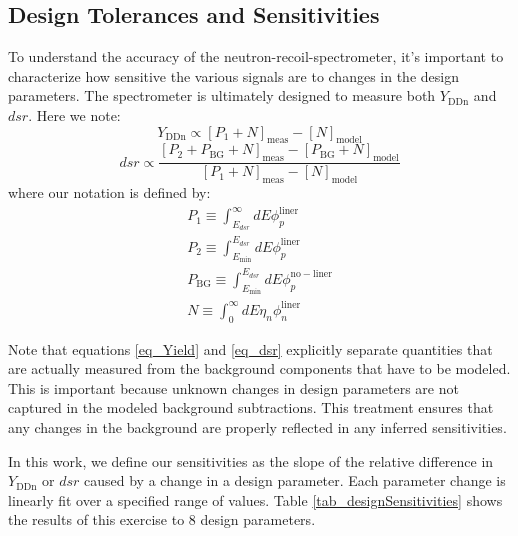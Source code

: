\subsection{Design Tolerances and Sensitivities}

To understand the accuracy of the neutron-recoil-spectrometer, it's important to characterize how sensitive the various signals are to changes in the design parameters. The spectrometer is ultimately designed to measure both $Y_{\mathrm{DDn}}$ and $dsr$. Here we note:
%
\begin{equation}
	Y_{\mathrm{DDn}} \propto \left[P_{1} + N\right]_{\mathrm{meas}} - \left[N\right]_{\mathrm{model}}
	\label{eq_Yield}
\end{equation}
%
\begin{equation}
	dsr \propto \frac{\left[P_2 + P_{\mathrm{BG}} + N\right]_{\mathrm{meas}} - \left[P_{\mathrm{BG}} + N\right]_{\mathrm{model}}}{\left[P_{1} + N\right]_{\mathrm{meas}} - \left[N\right]_{\mathrm{model}}}
	\label{eq_dsr}
\end{equation}
%
where our notation is defined by:
\begin{align}
	P_1 \equiv \int_{E_{dsr}}^{\infty}dE \phi_p^{\mathrm{liner}} \\
	P_2 \equiv \int_{E_{\mathrm{min}}}^{E_{dsr}}dE \phi_p^{\mathrm{liner}}
	\\
	P_{\mathrm{BG}} \equiv \int_{E_{\mathrm{min}}}^{E_{dsr}}dE \phi_p^{\mathrm{no-liner}}
	\\
	N \equiv \int_{0}^{\infty}dE \eta_n\phi_n^{\mathrm{liner}} 
\end{align}

Note that equations \ref{eq_Yield} and \ref{eq_dsr} explicitly separate quantities that are actually measured from the background components that have to be modeled. This is important because unknown changes in design parameters are not captured in the modeled background subtractions. This treatment ensures that any changes in the background are properly reflected in any inferred sensitivities.

In this work, we define our sensitivities as the slope of the relative difference in $Y_{\mathrm{DDn}}$ or $dsr$ caused by a change in a design parameter. Each parameter change is linearly fit over a specified range of values. Table \ref{tab_designSensitivities} shows the results of this exercise to 8 design parameters.

